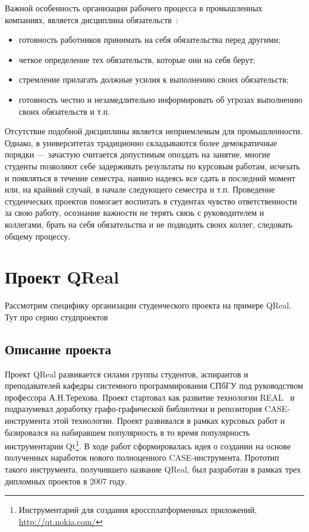 \documentclass[a4paper]{article}
\begin{document}
Важной особенность организации рабочего процесса в промышленных компаниях, является дисциплина обязательств~\cite{obyzat}:
\begin{itemize}
 \item готовность работников принимать на себя обязательства перед другими;
 \item четкое определение тех обязательств, которые они на себя берут;
 \item стремление прилагать должные усилия к выполнению своих обязательств;
 \item готовность честно и незамедлительно информировать об угрозах выполнению своих обязательств и т.п.
\end{itemize}
Отсутствие подобной дисциплины является неприемлемым для промышленности. Однако, в университетах традиционно складываются более демократичные порядки --- зачастую считается допустимым опоздать на занятие, многие студенты позволяют себе задерживать результаты по курсовым работам, исчезать и появляться в течение семестра, наивно надеясь все сдать в последний момент или, на крайний случай, в начале следующего семестра и т.п. Проведение студенческих проектов помогает воспитать в студентах чувство ответственности за свою работу, осознание важности не терять связь с руководителем и коллегами, брать на себя обязательства и не подводить своих коллег, следовать общему процессу.

\section{Проект QReal}

Рассмотрим специфику организации студенческого проекта на примере QReal. Тут про серию студпроектов

\subsection{Описание проекта}

Проект QReal развивается силами группы студентов, аспирантов и преподавателей кафедры системного программирования СПбГУ под руководством профессора А.Н.Терехова. Проект стартовал как развитие технологии REAL~\cite{real} и подразумевал доработку графо-графической библиотеки и репозитория CASE-инструмента этой технологии. Проект развивался в рамках курсовых работ и базировался на набиравшем популярность в то время популярность инструментарии Qt\footnote{Инструментарий для создания кроссплатформенных приложений, \url{http://qt.nokia.com/}}. В ходе работ сформировалась идея о создании на основе полученных наработок нового полноценного CASE-инструмента. Прототип такого инструмента, получившего название QReal, был разработан в рамках трех дипломных проектов в 2007 году. 
\end{document}
